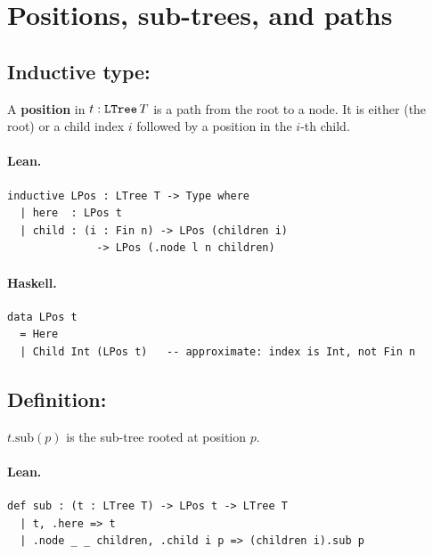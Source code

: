 \documentclass[11pt,a4paper]{article}
\begin{document}
\section{Positions, sub-trees, and paths}

\subsection{Inductive type: }

\begin{defn}
A \textbf{position} in $t : \texttt{LTree}\,T$ is a path from the root to a
node.  It is either  (the root) or a child index $i$ followed by
a position in the $i$-th child.
\end{defn}

\paragraph{Lean.}
\begin{lstlisting}[style=lean]
inductive LPos : LTree T -> Type where
  | here  : LPos t
  | child : (i : Fin n) -> LPos (children i)
              -> LPos (.node l n children)
\end{lstlisting}

\paragraph{Haskell.}
\begin{lstlisting}[style=haskell]
data LPos t
  = Here
  | Child Int (LPos t)   -- approximate: index is Int, not Fin n
\end{lstlisting}


\subsection{Definition: }

\begin{defn}
$t.\mathrm{sub}(p)$ is the sub-tree rooted at position $p$.
\end{defn}

\paragraph{Lean.}
\begin{lstlisting}[style=lean]
def sub : (t : LTree T) -> LPos t -> LTree T
  | t, .here => t
  | .node _ _ children, .child i p => (children i).sub p
\end{lstlisting}
\end{document}
